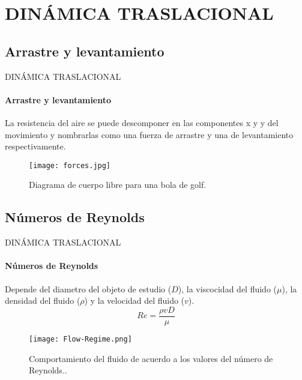 
\section{DINÁMICA TRASLACIONAL}
\subsection{Arrastre y levantamiento}
\begin{frame}{DINÁMICA TRASLACIONAL}
\framesubtitle{Arrastre y levantamiento}
	La resistencia del aire se puede descomponer en las componentes x y y del movimiento y
nombrarlas como una fuerza de arrastre y una de levantamiento respectivamente.
	\begin{figure}[H]
      \centering
      \texttt{[image: forces.jpg]}
      \caption{Diagrama de cuerpo libre para una bola de golf\footnotemark{}.}
    \end{figure}
\end{frame}


\subsection{Números de Reynolds}
\begin{frame}{DINÁMICA TRASLACIONAL}
\framesubtitle{Números de Reynolds}
	Depende del diametro del objeto de estudio ($D$), la viscocidad del fluido ($\mu$), la densidad del fluido ($\rho$) y la velocidad del fluido ($v$).
	\begin{equation}
		Re=\frac{\rho vD}{\mu}
	\end{equation}
    \begin{figure}[H]
      \centering
      \texttt{[image: Flow-Regime.png]}
      \caption{Comportamiento del fluido de acuerdo a los valores del número de Reynolds.\footnotemark{}.}
    \end{figure}
     \vspace{-1cm}
   	\end{frame}
    

